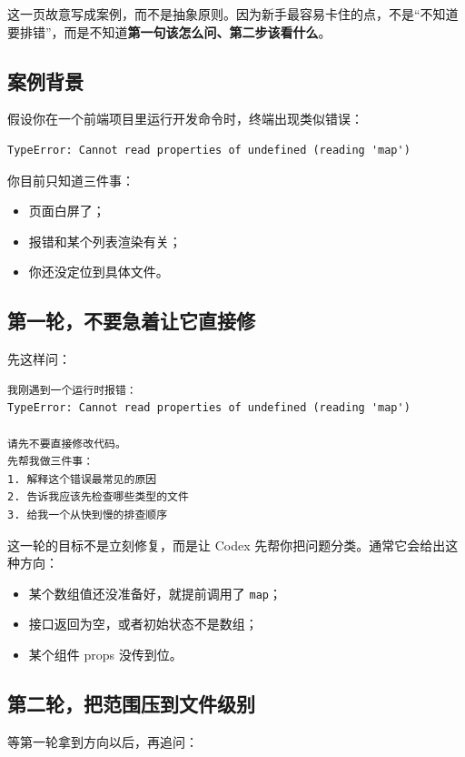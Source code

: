 \documentclass[UTF8,a4paper,12pt]{ctexart}
\begin{document}
这一页故意写成案例，而不是抽象原则。因为新手最容易卡住的点，不是“不知道要排错”，而是不知道\textbf{第一句该怎么问、第二步该看什么}。

\subsection{案例背景}

假设你在一个前端项目里运行开发命令时，终端出现类似错误：

\begin{lstlisting}[style=cli]
TypeError: Cannot read properties of undefined (reading 'map')
\end{lstlisting}

你目前只知道三件事：
\begin{itemize}
  \item 页面白屏了；
  \item 报错和某个列表渲染有关；
  \item 你还没定位到具体文件。
\end{itemize}

\subsection{第一轮，不要急着让它直接修}

先这样问：

\begin{lstlisting}[style=prompt]
我刚遇到一个运行时报错：
TypeError: Cannot read properties of undefined (reading 'map')

请先不要直接修改代码。
先帮我做三件事：
1. 解释这个错误最常见的原因
2. 告诉我应该先检查哪些类型的文件
3. 给我一个从快到慢的排查顺序
\end{lstlisting}

这一轮的目标不是立刻修复，而是让 Codex 先帮你把问题分类。通常它会给出这种方向：
\begin{itemize}
  \item 某个数组值还没准备好，就提前调用了 \texttt{map}；
  \item 接口返回为空，或者初始状态不是数组；
  \item 某个组件 props 没传到位。
\end{itemize}

\subsection{第二轮，把范围压到文件级别}

等第一轮拿到方向以后，再追问：
\end{document}
